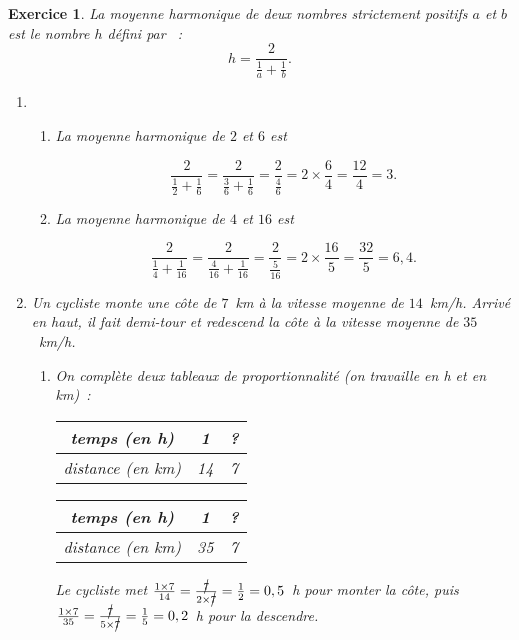 \documentclass[10pt]{article}
\newtheorem{exo}{Exercice}
\begin{document}
\begin{exo}

La moyenne harmonique de deux nombres strictement positifs $a$ et $b$ est le nombre $h$ défini par~ :
\[h=\frac{2}{\frac{1}{a}+\frac{1}{b}}.\]
\begin{enumerate}


\item 
\begin{enumerate}
\item La moyenne harmonique de $2$ et $6$ est

\[\frac{2}{\frac{1}{2}+\frac{1}{6}}=\frac{2}{\frac{3}{6}+\frac{1}{6}}=\frac{2}{\frac{4}{6}}=2\times\frac{6}{4}=\frac{12}{4}=3.\]
\item La moyenne harmonique de $4$ et $16$ est

\[\frac{2}{\frac{1}{4}+\frac{1}{16}}=\frac{2}{\frac{4}{16}+\frac{1}{16}}=\frac{2}{\frac{5}{16}}=2\times\frac{16}{5}=\frac{32}{5}=6,4.\]
\end{enumerate}
\item Un cycliste monte une côte de $7$~km à la vitesse moyenne de $14$~km/h. Arrivé en haut, il fait demi-tour et redescend la côte à la vitesse moyenne de $35$~km/h.

\begin{enumerate}
\item On complète deux tableaux de proportionnalité (on travaille en h et en km)~:

\begin{multicols}{2}

\begin{center}
\begin{tabular}{|c|c|c|}\hline
temps (en h)& 1&? \\ \hline 
distance (en km)&14& 7 \\ \hline
\end{tabular}


\begin{tabular}{|c|c|c|}\hline
temps (en h)& 1&? \\ \hline 
distance (en km)&35& 7 \\ \hline
\end{tabular}
\end{center}

\end{multicols}

Le cycliste met $\frac{1\times 7}{14}=\frac{\cancel{7}}{2\times\cancel{7}}=\frac{1}{2}=0,5$~h pour monter la côte, puis $\frac{1\times 7}{35}=\frac{\cancel{7}}{5\times\cancel{7}}=\frac{1}{5}=0,2$~h pour la descendre.


\end{enumerate}
\end{enumerate}
\end{exo}
\end{document}
